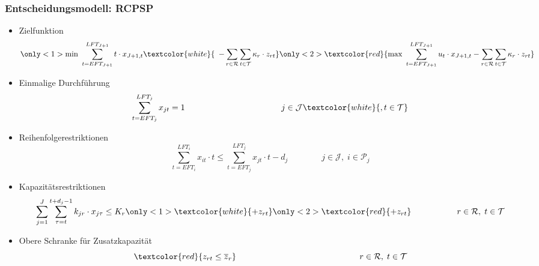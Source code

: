 \begin{frame}
\frametitle{Entscheidungsmodell: RCPSP}
\begin{footnotesize}
\begin{itemize}
\item Zielfunktion\\[-7mm]
\[
		\only<1>{\mbox{min } \sum_{t=EFT_{J+1}}^{LFT_{J+1}} t \cdot x_{{J+1},t} \textcolor{white}{\enspace - \sum_{r \in \mathcal{R}} \sum_{t \in \mathcal{T}} \kappa_r \cdot z_{rt}}}\only<2>{\textcolor{red}{\mbox{max } \sum_{t=EFT_{J+1}}^{LFT_{J+1}} u_t \cdot x_{{J+1},t} - \sum_{r \in \mathcal{R}} \sum_{t \in \mathcal{T}} \kappa_r \cdot z_{rt}}}
\]

\item Einmalige Durchführung
\[
\sum_{t=EFT_j}^{LFT_j} x_{jt} = 1 \,\,\,\quad\quad\quad\quad\quad\quad\quad\quad\quad\quad\quad j \in \mathcal{J}\textcolor{white}{, t \in \mathcal{T}}
\]

\item Reihenfolgerestriktionen
\[
\sum_{t=EFT_i}^{LFT_i} x_{it} \cdot t \leq \sum_{t=EFT_j}^{LFT_j} x_{jt} \cdot t - d_j \,\,\:\:\:\quad\quad\quad j \in \mathcal{J}, \; i \in \mathcal{P}_j
\]

\item Kapazitätsrestriktionen
\[
\sum_{j=1}^{J} \sum_{\tau=t}^{t+d_j-1} k_{jr} \cdot x_{j\tau} \leq K_r\only<1>{\textcolor{white}{ + z_{rt}}}\only<2>{ \textcolor{red}{+ z_{rt}}} \,\,\:\:\:\:\:\quad\quad\quad\quad r \in \mathcal{R}, \; t \in \mathcal{T}
\]

\item<2> Obere Schranke für Zusatzkapazität\\[-3mm]
\[
\textcolor{red}{z_{rt} \leq \overline{z}_r} \,\;\;\quad\quad\quad\quad\quad\quad\quad\quad\quad\quad\quad\quad\quad\quad r \in \mathcal{R}, \; t \in \mathcal{T}
\]
\end{itemize}
\end{footnotesize}
\end{frame}



